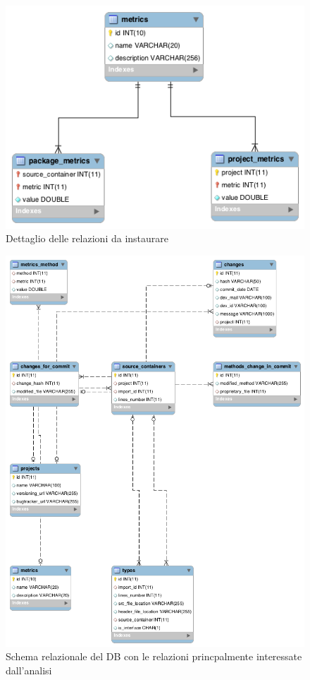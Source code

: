 \begin{figure}[t]
	\centering
	\includegraphics[width=.5\textwidth]{img/dettaglio.png}
	\caption{Dettaglio delle relazioni da instaurare}\label{fig:dettaglio}
\end{figure}

\begin{figure}[b]
	\centering
	\includegraphics[width=\textwidth]{img/sieImportant.png}
	\caption{Schema relazionale del DB con le relazioni princpalmente interessate dall'analisi}\label{fig:sie}
\end{figure}

